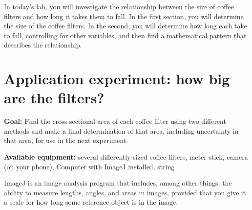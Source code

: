 In today's lab, you will investigate the relationship between the size of coffee filters and how long it takes them to fall. In the first section, you will determine the size of the coffee filters. In the second, you will determine how long each take to fall, controlling for other variables, and then find a mathematical pattern that describes the relationship.

\section{Application experiment: how big are the filters?}

\textbf{Goal:} Find the cross-sectional area of each coffee filter using two different methods and make a final determination of that area, including uncertainty in that area, for use in the next experiment.
 
\textbf{Available equipment:} several differently-sized coffee filters, meter stick, camera (on your phone), Computer with ImageJ installed, string

\begin{framed}
	ImageJ is an image analysis program that includes, among other things, the ability to measure lengths, angles, and areas in images, provided that you give it a scale for how long some reference object is in the image.
\end{framed}

